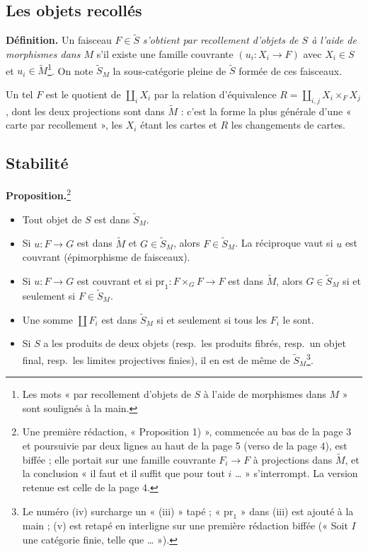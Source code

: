 \documentclass[11pt,a4paper]{article}
\begin{document}
\subsection*{Les objets recollés}

\textbf{Définition.} Un faisceau $F \in \widetilde{S}$ \emph{s'obtient par
recollement d'objets de $S$ à l'aide de morphismes dans $M$} s'il existe une
famille couvrante $(u_i : X_i \to F)$ avec $X_i \in S$ et
$u_i \in \widetilde{M}$\footnote{Les mots « par recollement d'objets de $S$ à
l'aide de morphismes dans $M$ » sont soulignés à la main.}. On note
$\widetilde{S}_M$ la sous-catégorie pleine de $\widetilde{S}$ formée de ces
faisceaux.

Un tel $F$ est le quotient de $\coprod_i X_i$ par la relation d'équivalence
$R = \coprod_{i,j} X_i \times_F X_j$, dont les deux projections sont dans
$\widetilde{M}$ : c'est la forme la plus générale d'une « carte par
recollement », les $X_i$ étant les cartes et $R$ les changements de cartes.

\subsection*{Stabilité}

\textbf{Proposition.}\footnote{Une première rédaction, « Proposition 1) »,
commencée au bas de la page 3 et poursuivie par deux lignes au haut de la
page 5 (verso de la page 4), est biffée ; elle portait sur une famille couvrante
$F_i \to F$ à projections dans $\widetilde{M}$, et la conclusion « il faut et il
suffit que pour tout $i$ … » s'interrompt. La version retenue est celle de la
page 4.}
\begin{itemize}
  \item[(i)] Tout objet de $S$ est dans $\widetilde{S}_M$.
  \item[(ii)] Si $u : F \to G$ est dans $\widetilde{M}$ et $G \in \widetilde{S}_M$,
    alors $F \in \widetilde{S}_M$. La réciproque vaut si $u$ est couvrant
    (épimorphisme de faisceaux).
  \item[(iii)] Si $u : F \to G$ est couvrant et si
    $\mathrm{pr}_1 : F \times_G F \to F$ est dans $\widetilde{M}$, alors
    $G \in \widetilde{S}_M$ si et seulement si $F \in \widetilde{S}_M$.
  \item[(iv)] Une somme $\coprod F_i$ est dans $\widetilde{S}_M$ si et seulement
    si tous les $F_i$ le sont.
  \item[(v)] Si $S$ a les produits de deux objets (resp.\ les produits fibrés,
    resp.\ un objet final, resp.\ les limites projectives finies), il en est de
    même de $\widetilde{S}_M$\footnote{Le numéro (iv) surcharge un « (iii) »
    tapé ; « $\mathrm{pr}_1$ » dans (iii) est ajouté à la main ; (v) est retapé
    en interligne sur une première rédaction biffée (« Soit $I$ une catégorie
    finie, telle que … »).}.
\end{itemize}
\end{document}
